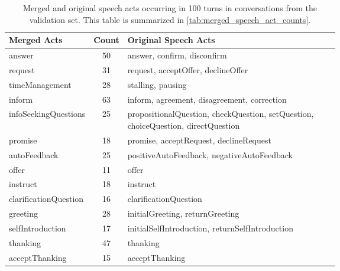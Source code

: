 \documentclass[11pt]{article}
\begin{document}
\begin{table*}[h]
    \small
    \centering
    \begin{tabular}{l c p{0.65\linewidth}}
        \toprule
\textbf{Merged Acts}     & \multicolumn{1}{l}{\textbf{Count}} & \textbf{Original Speech Acts}                                                     \\ \midrule
answer                & 50                                 & answer, confirm, disconfirm                                                       \\
request               & 31                                 & request, acceptOffer, declineOffer                                                \\
timeManagement        & 28                                 & stalling, pausing                                                                 \\
inform                & 63                                 & inform, agreement, disagreement, correction                                       \\
infoSeekingQuestions  & 25                                 & propositionalQuestion, checkQuestion, setQuestion, choiceQuestion, directQuestion \\
promise               & 18                                 & promise, acceptRequest, declineRequest                                            \\
autoFeedback          & 25                                 & positiveAutoFeedback, negativeAutoFeedback                                        \\
offer                 & 11                                 & offer                                                                             \\
instruct              & 18                                 & instruct                                                                          \\
clarificationQuestion & 16                                 & clarificationQuestion                                                             \\
greeting              & 28                                 & initialGreeting, returnGreeting                                                   \\
selfIntroduction      & 17                                 & initialSelfIntroduction, returnSelfIntroduction                                  \\
thanking              & 47                                 & thanking                                                                          \\
acceptThanking        & 15                                 & acceptThanking                       
\\
        \bottomrule
    \end{tabular}
    \caption{Merged and original speech acts occurring in 100 turns in conversations from the validation set. This table is summarized in \autoref{tab:merged_speech_act_counts}.}
    \label{tab:iso_speech_acts_count}
\end{table*}
\end{document}
